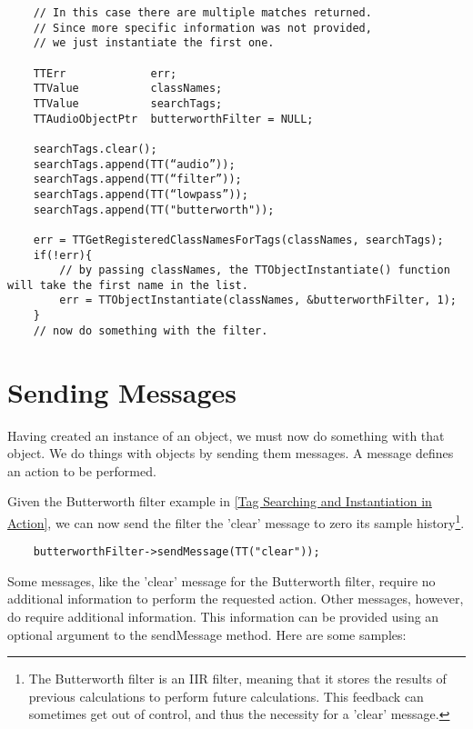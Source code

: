 \begin{small}\begin{verbatim}
	// In this case there are multiple matches returned. 
	// Since more specific information was not provided, 
	// we just instantiate the first one.
	
	TTErr             err;
	TTValue           classNames;
	TTValue           searchTags;
	TTAudioObjectPtr  butterworthFilter = NULL;
	
	searchTags.clear();
	searchTags.append(TT(“audio”));
	searchTags.append(TT(“filter”));
	searchTags.append(TT(“lowpass”));
	searchTags.append(TT("butterworth"));
	
	err = TTGetRegisteredClassNamesForTags(classNames, searchTags);
	if(!err){
		// by passing classNames, the TTObjectInstantiate() function will take the first name in the list.
		err = TTObjectInstantiate(classNames, &butterworthFilter, 1);
	}
	// now do something with the filter.
\end{verbatim}\end{small}





\section{Sending Messages}

Having created an instance of an object, we must now do something with that object.
We do things with objects by sending them messages. 
A message defines an action to be performed. 

Given the Butterworth filter example in \ref{Tag Searching and Instantiation in Action}, we can now send the filter the 'clear' message to zero its sample history\footnote{The Butterworth filter is an IIR filter, meaning that it stores the results of previous calculations to perform future calculations.  This feedback can sometimes get out of control, and thus the necessity for a 'clear' message.}.

\begin{small}\begin{verbatim}
	butterworthFilter->sendMessage(TT("clear"));
\end{verbatim}\end{small}

Some messages, like the 'clear' message for the Butterworth filter, require no additional information to perform the requested action.
Other messages, however, do require additional information.  
This information can be provided using an optional argument to the sendMessage method.  Here are some samples:


